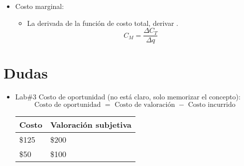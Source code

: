 \begin{itemize}
\begin{itemize}
            \item Costo marginal:
                \begin{itemize}
                    \item La derivada de la función de costo total, derivar .
                        \[
                          C_M = \frac{\Delta C_T}{\Delta q} 
                        \]
                \end{itemize}
        \end{itemize}
\end{itemize}


\section{Dudas}
\begin{itemize}
    \item Lab\#3 Costo de oportunidad (no está claro, solo memorizar el concepto):
        \[
          \text{ Costo de oportunidad } = \text{ Costo de valoración } - \text{ Costo incurrido }
        \]
        \begin{center}
           \begin{tabular}{ | p{5cm} | p{5cm} | }
               \hline
                    Costo & Valoración subjetiva   \\
                \hline
                    \$125 & \$200 \\ 
                    \$50 & \$100 \\ 
               \hline
           \end{tabular}
        \end{center}
\end{itemize}
